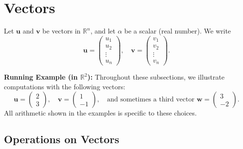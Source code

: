 \section{Vectors}

\noindent
Let $\mathbf{u}$ and $\mathbf{v}$ be vectors in $\mathbb{R}^n$, and let $\alpha$ be a scalar 
(real number). We write
\[
\mathbf{u} =
\begin{pmatrix}
u_1 \\
u_2 \\
\vdots \\
u_n
\end{pmatrix}, 
\quad
\mathbf{v} =
\begin{pmatrix}
v_1 \\
v_2 \\
\vdots \\
v_n
\end{pmatrix}.
\]

\noindent
\textbf{Running Example (in $\mathbb{R}^2$):} 
Throughout these subsections, we illustrate computations with the following vectors:
\[
\mathbf{u} = 
\begin{pmatrix}
2 \\
3
\end{pmatrix}, 
\quad
\mathbf{v} = 
\begin{pmatrix}
1 \\
-1
\end{pmatrix},
\quad
\text{and sometimes a third vector }
\mathbf{w} =
\begin{pmatrix}
3 \\
-2
\end{pmatrix}.
\]
All arithmetic shown in the examples is specific to these choices.

\subsection{Operations on Vectors}

